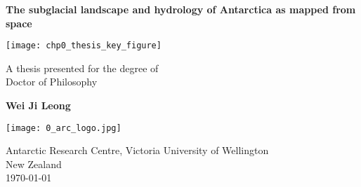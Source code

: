\begin{titlepage}
  \begin{center}

    \LARGE
    \textbf{
      The subglacial landscape and hydrology of Antarctica as mapped from space
    }

    \texttt{[image: chp0\_thesis\_key\_figure]}

    \Large
    A thesis presented for the degree of\\
    Doctor of Philosophy

    \vspace{0.8cm}

    \textbf{Wei Ji Leong}

    \texttt{[image: 0\_arc\_logo.jpg]}

    \Large
    Antarctic Research Centre, Victoria University of Wellington\\
    New Zealand\\
    \today

  \end{center}
\end{titlepage}
